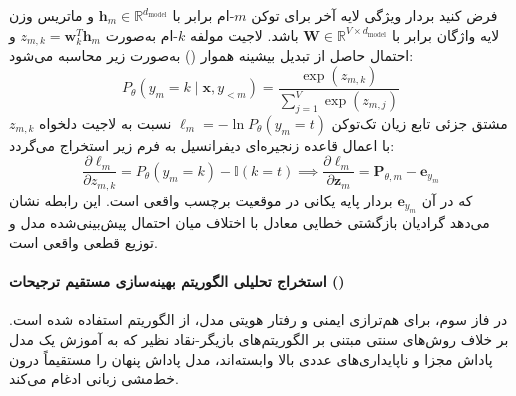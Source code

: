 فرض کنید بردار ویژگی لایه آخر برای توکن $m$-ام برابر با $\mathbf{h}_m \in \mathbb{R}^{d_{\text{model}}}$ و ماتریس وزن لایه واژگان برابر با $\mathbf{W} \in \mathbb{R}^{V \times d_{\text{model}}}$ باشد. لاجیت مولفه $k$-ام به‌صورت $z_{m,k} = \mathbf{w}_k^T \mathbf{h}_m$ و احتمال حاصل از تبدیل بیشینه هموار () به‌صورت زیر محاسبه می‌شود:
\begin{equation}
    P_\theta(y_m = k \mid \mathbf{x}, y_{<m}) = \frac{\exp(z_{m,k})}{\sum_{j=1}^{V} \exp(z_{m,j})}
\end{equation}
مشتق جزئی تابع زیان تک‌توکن $\ell_m = - \ln P_\theta(y_m = t)$ نسبت به لاجیت دلخواه $z_{m,k}$ با اعمال قاعده زنجیره‌ای دیفرانسیل به فرم زیر استخراج می‌گردد:
\begin{equation}
    \frac{\partial \ell_m}{\partial z_{m,k}} = P_\theta(y_m = k) - \mathbb{I}(k = t) \implies \frac{\partial \ell_m}{\partial \mathbf{z}_m} = \mathbf{P}_{\theta, m} - \mathbf{e}_{y_m}
\end{equation}
که در آن $\mathbf{e}_{y_m}$ بردار پایه یکانی در موقعیت برچسب واقعی است. این رابطه نشان می‌دهد گرادیان بازگشتی خطایی معادل با اختلاف میان احتمال پیش‌بینی‌شده مدل و توزیع قطعی واقعی است.

\paragraph*{استخراج تحلیلی الگوریتم بهینه‌سازی مستقیم ترجیحات ()}
در فاز سوم، برای هم‌ترازی ایمنی و رفتار هویتی مدل، از الگوریتم  \cite{rafailov2024dpo} استفاده شده است. بر خلاف روش‌های سنتی  مبتنی بر الگوریتم‌های بازیگر-نقاد نظیر  که به آموزش یک مدل پاداش مجزا و ناپایداری‌های عددی بالا وابسته‌اند،  مدل پاداش پنهان را مستقیماً درون خط‌مشی زبانی ادغام می‌کند.

